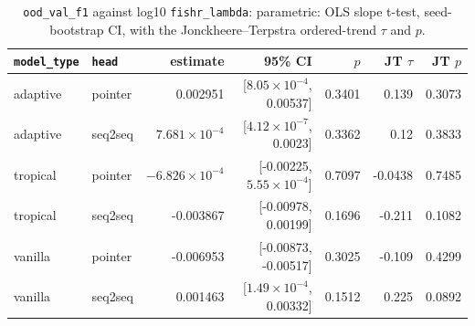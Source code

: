 \documentclass[10pt]{article}
\begin{document}
{\small
\begin{longtable}{llrrrrr}
\caption{\texttt{ood\_val\_f1} against log10 \texttt{fishr\_lambda}: parametric: OLS slope t-test, seed-bootstrap CI, with the Jonckheere--Terpstra ordered-trend $\tau$ and $p$.}\label{tab:trend-ood_val_f1}\\
\toprule
\texttt{model\_type} & \texttt{head} & estimate & 95\% CI & $p$ & JT $\tau$ & JT $p$\\
\midrule
\endhead
adaptive & pointer & 0.002951 & [$8.05\times10^{-4}$, 0.00537] & 0.3401 & 0.139 & 0.3073\\
adaptive & seq2seq & $7.681\times10^{-4}$ & [$4.12\times10^{-7}$, 0.0023] & 0.3362 & 0.12 & 0.3833\\
tropical & pointer & $-6.826\times10^{-4}$ & [-0.00225, $5.55\times10^{-4}$] & 0.7097 & -0.0438 & 0.7485\\
tropical & seq2seq & -0.003867 & [-0.00978, 0.00199] & 0.1696 & -0.211 & 0.1082\\
vanilla & pointer & -0.006953 & [-0.00873, -0.00517] & 0.3025 & -0.109 & 0.4299\\
vanilla & seq2seq & 0.001463 & [$1.49\times10^{-4}$, 0.00332] & 0.1512 & 0.225 & 0.0892\\
\bottomrule
\end{longtable}
}
\end{document}
